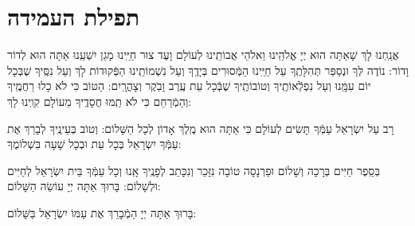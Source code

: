 \documentclass[twoside, openany, parskip=half, 11pt]{book}
\begin{document}
\emesveemuna 

\hashkiveinu 

\boruchhashemleolam 

\yerueinnu 

\halfkaddish 

 \section*{ תפילת העמידה }
 

\amidaopening{\ayt}{}

\weekdaysakiddushhashem

\weekdaysabinah

\weekdaysateshuva

\weekdaysaselichah

\weekdaysageulah

\weekdaysarefuah

\weekdaysaberacha

\weekdaysashofar

\weekdaysamishpat

\weekdaysaminim

\weekdaysatzadikim

\weekdaysayerushelayim

\weekdaysamalchus

\weekdaysashemakoleinu

\retzeh

\clearpage

\vspace{-\baselineskip}
\yaalehveyavo

\zion

\newcommand{\maarivmodim}{
\firstword{מוֹדִים}
 אֲנַֽחְנוּ לָךְ שָׁאַתָּה הוּא יְיָ אֱלֹהֵֽינוּ וֵאלֹהֵי אֲבוֹתֵֽינוּ לְעוֹלָם וָעֶד צוּר חַיֵּֽינוּ מָגֵן יִשְׁעֵֽנוּ אַתָּה הוּא לְדוֹר וָדוֹר: נוֹדֶה לְּךָ וּנְסַפֵּר תְּהִלָּתֶֽךָ עַל חַיֵּֽינוּ הַמְּֿסוּרִים בְּיָדֶֽךָ וְעַל נִשְׁמוֹתֵֽינוּ הַפְּֿקוּדוֹת לָךְ וְעַל נִסֶּֽיךָ שֶׁבְּכָל יוֹם עִמָּֽנוּ וְעַל נִפְלְֿאוֹתֶֽיךָ וְטוֹבוֹתֶֽיךָ שֶׁבְּֿכָל עֵת עֶֽרֶב וָבֹֽקֶר וְצָהֳרָֽיִם: הַטּוֹב כִּי לֹא כָלוּ רַחֲמֶֽיךָ וְהַמְֿרַחֵם כִּי לֹא תַֽמּוּ חֲסָדֶֽיךָ מֵעוֹלָם קִוִֽינוּ לָךְ:
}

\maarivmodim

\alhanisim

\weekdaysahodos

 רָב עַל יִשְׂרָאֵל עַמְּֿךָ תָּשִׂים לְעוֹלָם כִּי אַתָּה הוּא מֶֽלֶךְ אָדוֹן לְכָל הַשָּׁלוֹם: וְטוֹב בְּעֵינֶֽיךָ לְבָרֵךְ אֶת עַמְּֿךָ יִשְׂרָאֵל בְּכָל עֵת וּבְכָל שָׁעָה בִּשְׁלוֹמֶךָ:
 \vspace{-0.4\baselineskip}
\begin{paracol}{2}

\begin{small}
בְּסֵֽפֶר חַיִּים בְּרָכָה וְשָׁלוֹם וּפַרְנָסָה טוֹבָה נִזָּכֵר וְנִכָּתֵב לְפָנֶֽיךָ אָֽנוּ וְכָל עַמְּֿךָ בֵּית יִשְׂרָאֵל לְחַיִּים וּלְשָׁלוֹם: בָּרוּךְ אַתָּה יְיָ עוֹשֵׂה הַשָּׁלוֹם:

\end{small}
\switchcolumn
בָּרוּךְ אַתָּה יְיָ הַמְֿבָרֵךְ אֶת עַמּוֹ יִשְׂרָאֵל בַּשָּׁלוֹם:

\end{paracol}
\end{document}
